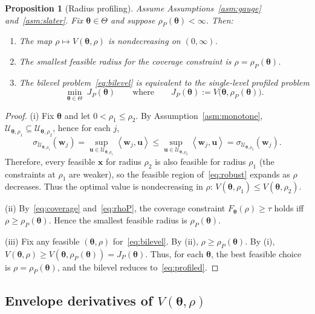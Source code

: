 \documentclass[11pt]{article}
\newcommand{\cU}{\mathcal{U}}
\newcommand{\ip}[2]{\left\langle #1, #2 \right\rangle}
\newcommand{\btheta}{\bm{\theta}}
\newcommand{\bu}{\bm{u}}
\newcommand{\bw}{\bm{w}}
\newcommand{\bx}{\bm{x}}
\theoremstyle{plain}
\newtheorem{proposition}[theorem]{Proposition}
\theoremstyle{definition}
\begin{document}
\begin{proposition}[Radius profiling]\label{prop:profiling}
Assume Assumptions~\ref{asm:gauge} and~\ref{asm:slater}. Fix $\btheta\in\Theta$ and suppose $\rho_P(\btheta)<\infty$.
Then:
\begin{enumerate}[label=(\roman*), leftmargin=2em, itemsep=1pt]
\item The map $\rho\mapsto V(\btheta,\rho)$ is nondecreasing on $(0,\infty)$.
\item The smallest feasible radius for the coverage constraint is $\rho=\rho_P(\btheta)$.
\item The bilevel problem~\eqref{eq:bilevel} is equivalent to the single-level \emph{profiled} problem
\begin{equation}\label{eq:profiled}
\min_{\btheta\in\Theta}\; J_P(\btheta)
\qquad\text{where}\qquad
J_P(\btheta):=V\big(\btheta,\rho_P(\btheta)\big).
\end{equation}
\end{enumerate}
\end{proposition}

\begin{proof}
(i) Fix $\btheta$ and let $0<\rho_1\le \rho_2$. By Assumption~\ref{asm:monotone},
$\cU_{\btheta,\rho_1}\subseteq \cU_{\btheta,\rho_2}$, hence for each $j$,
\[
\sigma_{\cU_{\btheta,\rho_1}}(\bw_j)
=\sup_{\bu\in \cU_{\btheta,\rho_1}}\ip{\bw_j}{\bu}
\le
\sup_{\bu\in \cU_{\btheta,\rho_2}}\ip{\bw_j}{\bu}
=
\sigma_{\cU_{\btheta,\rho_2}}(\bw_j).
\]
Therefore, every feasible $\bx$ for radius $\rho_2$ is also feasible for radius $\rho_1$ (the constraints at $\rho_1$ are weaker),
so the feasible region of~\eqref{eq:robust} expands as $\rho$ decreases. Thus the optimal value is nondecreasing in $\rho$:
$V(\btheta,\rho_1)\le V(\btheta,\rho_2)$.

(ii) By~\eqref{eq:coverage} and~\eqref{eq:rhoP}, the coverage constraint $F_{\btheta}(\rho)\ge \tau$ holds iff $\rho\ge \rho_P(\btheta)$.
Hence the smallest feasible radius is $\rho_P(\btheta)$.

(iii) Fix any feasible $(\btheta,\rho)$ for~\eqref{eq:bilevel}. By (ii), $\rho\ge \rho_P(\btheta)$.
By (i), $V(\btheta,\rho)\ge V(\btheta,\rho_P(\btheta))=J_P(\btheta)$.
Thus, for each $\btheta$, the best feasible choice is $\rho=\rho_P(\btheta)$, and the bilevel reduces to~\eqref{eq:profiled}.
\end{proof}

\subsection{Envelope derivatives of $V(\btheta,\rho)$}
\end{document}
